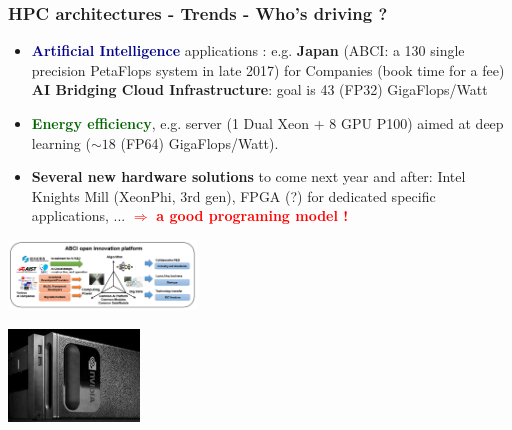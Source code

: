 \begin{frame}
  \frametitle{HPC architectures - Trends - Who's driving ?}

  \begin{minipage}{0.55\linewidth}
    \begin{itemize}
    \item \textcolor{darkblue}{\textbf{Artificial Intelligence}} applications : e.g. \textbf{Japan} (ABCI: a 130 single precision PetaFlops system in late 2017) for Companies (book time for a fee)\\
      \textbf{AI Bridging Cloud Infrastructure}: goal is 43 (FP32) GigaFlops/Watt\\
    \item \textcolor{darkgreen}{\textbf{Energy efficiency}}, e.g.  server (1 Dual Xeon + 8 GPU P100) aimed at deep learning ($\sim 18$ (FP64) GigaFlops/Watt).
    \item \textbf{Several new hardware solutions} to come next year and after: Intel Knights Mill (XeonPhi, 3rd gen), FPGA (?) for dedicated specific applications, ... \textcolor{red}{$\Rightarrow$ \textbf{a good programing model !}}
    \end{itemize}    
  \end{minipage}
  \begin{minipage}{0.4\linewidth}
    \begin{center}
      \includegraphics[width=5cm]{images/abci-innovation-800x298}
    \end{center}

    \begin{center}
      \includegraphics[width=3.5cm]{images/nvidia-dgx-1-bw-200x140}
    \end{center}
  \end{minipage}


\end{frame}
